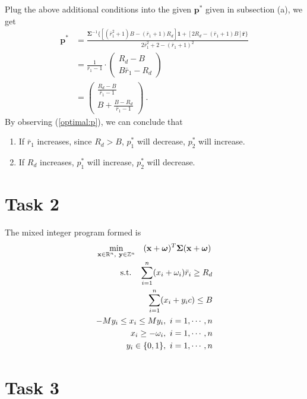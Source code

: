\documentclass[12pt]{ftec2101}
\newcommand{\vect}[1]{\mathbf{#1}}
\begin{document}
\noindent
Plug the above additional conditions into the given $\vect{p}^{*}$ given in subsection (a), we get
\begin{align}
    \vect{p}^{*} &= \frac{\boldsymbol{\Sigma}^{-1}\{[(\bar{r}_1^2+1)B-(\bar{r}_1+1)R_d]\vect{1}+[2R_d - (\bar{r}_1 + 1)B]\bar{\vect{r}}\}}{2\bar{r}_1^2 + 2 - (\bar{r}_1+1)^2} \\
    &= \frac{1}{\bar{r}_1 - 1} \cdot
    \begin{pmatrix}
        R_d - B \\
        B\bar{r}_1 - R_d
    \end{pmatrix}\\
    &=
    \begin{pmatrix}
        \frac{R_d-B}{\bar{r}_1 - 1} \\
        B+ \frac{B-R_d}{\bar{r}_1 - 1}
    \end{pmatrix}\ .
    \label{optimal:p}
\end{align}
By observing (\ref{optimal:p}), we can conclude that
\begin{enumerate}
    \item If $\bar{r}_1$ increases, since $R_d > B$, $p_1^{*}$ will decrease, $p_2^{*}$ will increase.
    \item If $R_d$ increases, $p_1^{*}$ will increase, $p_2^{*}$ will decrease.
\end{enumerate}

\section{Task 2}
The mixed integer program formed is
\begin{gather}
    \min_{\vect{x}\in\mathbb{R}^n ,\  \vect{y}\in \mathbb{Z}^n} \quad (\vect{x}+\boldsymbol{\omega})^T \boldsymbol{\Sigma} (\vect{x}+\boldsymbol{\omega}) \\
    \label{mix:integer}
    \begin{aligned}
    \textup{s.t.} \quad \sum_{i=1}^{n} (x_i+\omega_i)\bar{r}_i \geq R_d\\
                \sum_{i=1}^{n} (x_i+y_i c) \leq B\\
                -M y_i \leq x_i \leq M y_i,\ i=1,\cdots,n\\
                x_i \geq -\omega_i,\ i = 1,\cdots,n\\
                y_i \in \{0,1\},\ i = 1,\cdots,n
\end{aligned}
\end{gather}
\section{Task 3}
\end{document}
